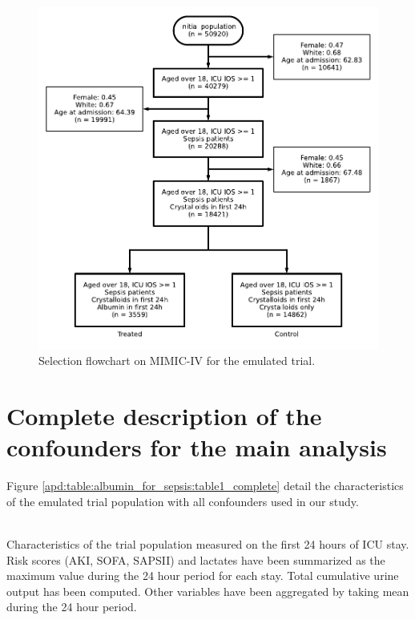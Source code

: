 \documentclass[french,12pt,twoside,a4paper]{book}
\begin{document}
\begin{appendices}
  \begin{figure}[!htb]
    \centering
    \includegraphics[width=0.8\linewidth]{img/chapter_4/albumin_for_sepsis__obs_1d__flowchart_albumin_for_sepsis.pdf}
    \caption{Selection flowchart on MIMIC-IV for the emulated trial.}\label{fig:selection_flowchart}
  \end{figure}

  \section{Complete description of the confounders for the main analysis}\label{apd:albumin_for_sepsis:table1_complete}

  Figure \ref{apd:table:albumin_for_sepsis:table1_complete} detail the characteristics of the emulated trial population with all confounders used in our study.

  \begin{table}[b!]
    \resizebox{\textwidth}{!}{%
      
    }\\
    \caption{Characteristics of the trial population measured on the first 24
      hours of ICU stay. \\
      Risk scores (AKI, SOFA, SAPSII) and lactates have been summarized as the
      maximum value during the 24 hour period for each stay. Total cumulative urine output has
      been computed. Other variables have been aggregated by taking mean during
      the 24 hour period.}\label{apd:table:albumin_for_sepsis:table1_complete}
  \end{table}



\end{appendices}
\end{document}
